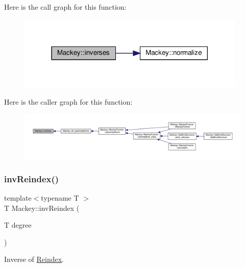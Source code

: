 Here is the call graph for this function\+:\nopagebreak
\begin{figure}[H]
\begin{center}
\leavevmode
\includegraphics[width=309pt]{namespaceMackey_ac8552763cbbe02f22cedc11c6f8434da_cgraph}
\end{center}
\end{figure}
Here is the caller graph for this function\+:\nopagebreak
\begin{figure}[H]
\begin{center}
\leavevmode
\includegraphics[width=350pt]{namespaceMackey_ac8552763cbbe02f22cedc11c6f8434da_icgraph}
\end{center}
\end{figure}
\mbox{\label{namespaceMackey_a5efb3695c450e4e590b86f20700f726b}} 
\subsubsection{\texorpdfstring{inv\+Reindex()}{invReindex()}\hspace{0.1cm}{\footnotesize\ttfamily [1/2]}}
{\footnotesize\ttfamily template$<$typename T $>$ \\
T Mackey\+::inv\+Reindex (\begin{DoxyParamCaption}\item[{T}]{degree }\end{DoxyParamCaption})\hspace{0.3cm}{\ttfamily [inline]}}



Inverse of \hyperlink{namespaceMackey_a7da73ade3ee83c4ffd614e79242d7c04}{Reindex}. 

